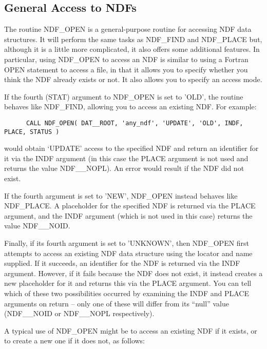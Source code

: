\documentclass[twoside,11pt]{article}
\newcommand{\htmlref}[2]{#1}
\newcommand{\xref}[3]{#1}
\newcommand{\xlabel}[1]{}
\begin{document}
\subsection{\xlabel{general_access_to_ndfs}\label{ss:generalaccess}General Access to NDFs}

The routine \htmlref{NDF\_OPEN}{NDF_OPEN} is a general-purpose routine for accessing NDF
data structures. It will perform the same tasks as \htmlref{NDF\_FIND}{NDF_FIND} and
\htmlref{NDF\_PLACE}{NDF_PLACE} but, although it is a little more complicated, it also
offers some additional features. In particular, using NDF\_OPEN to
access an NDF is similar to using a Fortran OPEN statement to access a
file, in that it allows you to specify whether you think the NDF
already exists or not. It also allows you to specify an access mode.

If the fourth (STAT) argument to NDF\_OPEN is set to 'OLD', the routine
behaves like NDF\_FIND, allowing you to access an existing NDF.  For
example:

\small
\begin{verbatim}
      CALL NDF_OPEN( DAT__ROOT, 'any_ndf', 'UPDATE', 'OLD', INDF, PLACE, STATUS )
\end{verbatim}
\normalsize

would obtain `UPDATE' access to the specified NDF and return an
identifier for it via the INDF argument (in this case the PLACE
argument is not used and returns the value NDF\_\_NOPL).  An error
would result if the NDF did not exist.

If the fourth argument is set to 'NEW', NDF\_OPEN instead behaves like
NDF\_PLACE. A placeholder for the specified NDF is returned via the
PLACE argument, and the INDF argument (which is not used in this case)
returns the value NDF\_\_NOID.

Finally, if its fourth argument is set to 'UNKNOWN', then NDF\_OPEN
first attempts to access an existing NDF data structure using the
\xref{locator}{sun92}{using_locators} and name supplied. If it
succeeds, an identifier for the NDF
is returned via the INDF argument. However, if it fails because the
NDF does not exist, it instead creates a new placeholder for it and
returns this via the PLACE argument. You can tell which of these two
possibilities occurred by examining the INDF and PLACE arguments on
return -- only one of these will differ from its ``null'' value
(NDF\_\_NOID or NDF\_\_NOPL respectively).

A typical use of NDF\_OPEN might be to access an existing NDF if it
exists, or to create a new one if it does not, as follows:
\end{document}
